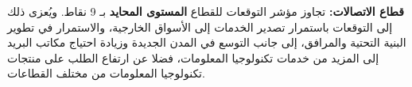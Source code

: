 \textbf{قطاع الاتصالات:} تجاوز مؤشر التوقعات للقطاع \textbf{المستوى المحايد} بـ 9 نقاط. ويُعزى ذلك إلى التوقعات باستمرار تصدير الخدمات إلى الأسواق الخارجية، والاستمرار في تطوير البنية التحتية والمرافق، إلى جانب التوسع في المدن الجديدة وزيادة احتياج مكاتب البريد إلى المزيد من خدمات تكنولوجيا المعلومات، فضلا عن ارتفاع الطلب على منتجات تكنولوجيا المعلومات من مختلف القطاعات.
